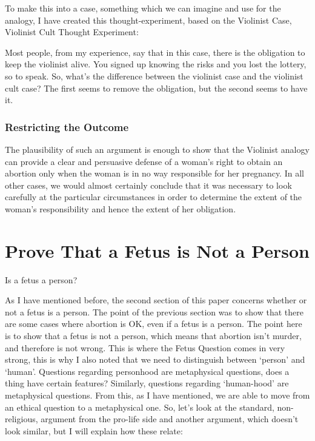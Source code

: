  To make this into a case, something which we can imagine and use for the analogy, I have created this thought-experiment, based on the Violinist Case, Violinist Cult Thought Experiment:


Most people, from my experience, say that in this case, there is the obligation to keep the violinist alive. You signed up knowing the risks and you lost the lottery, so to speak. So, what's the difference between the violinist case and the violinist cult case? The first seems to remove the obligation, but the second seems to have it. 

\subsubsection{Restricting the Outcome}

The plausibility of such an argument is enough to show that the Violinist analogy can provide a clear and persuasive defense of a woman’s right to obtain an abortion only when the woman is in no way responsible for her pregnancy. In all other cases, we would almost certainly conclude that it was necessary to look carefully at the particular circumstances in order to determine the extent of the woman’s responsibility and hence the extent of her obligation.

\section{Prove That a Fetus is Not a Person}
\begin{center}Is a fetus a person?\end{center}

As I have mentioned before, the second section of this paper concerns whether or not a fetus is a person. The point of the previous section was to show that there are some cases where abortion is OK, even if a fetus is a person. The point here is to show that a fetus is not a person, which means that abortion isn't murder, and therefore is not wrong. This is where the Fetus Question comes in very strong, this is why I also noted that we need to distinguish between `person' and `human'. Questions regarding personhood are metaphysical questions, does a thing have certain features? Similarly, questions regarding `human-hood' are metaphysical questions. From this, as I have mentioned, we are able to move from an ethical question to a metaphysical one. So, let's look at the standard, non-religious, argument from the pro-life side and another argument, which doesn't look similar, but I will explain how these relate:

